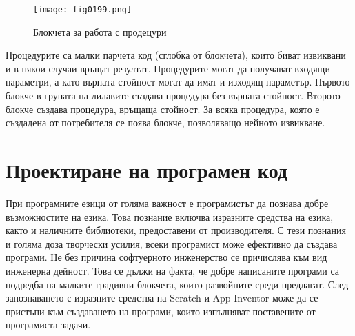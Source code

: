 \begin{figure}[H]
  \centering
  \texttt{[image: fig0199.png]}
  \caption{Блокчета за работа с продецури}
\label{fig0199}
\end{figure}

Процедурите са малки парчета код (сглобка от блокчета), които биват извиквани и в някои случаи връщат резултат. Процедурите могат да получават входящи параметри, а като върната стойност могат да имат и изходящ параметър. Първото блокче в групата на лилавите създава процедура без върната стойност. Второто блокче създава процедура, връщаща стойност. За всяка процедура, която е създадена от потребителя се поява блокче, позволяващо нейното извикване.

\section{Проектиране на програмен код}

При програмните езици от голяма важност е програмистът да познава добре възможностите на езика. Това познание включва изразните средства на езика, както и наличните библиотеки, предоставени от производителя. С тези познания и голяма доза творчески усилия, всеки програмист може ефективно да създава програми. Не без причина софтуерното инженерство се причислява към вид инженерна дейност. Това се дължи на факта, че добре написаните програми са подредба на малките градивни блокчета, които развойните среди предлагат. След запознаването с изразните средства на Scratch и App Inventor може да се пристъпи към създаването на програми, които изпълняват поставените от програмиста задачи.

